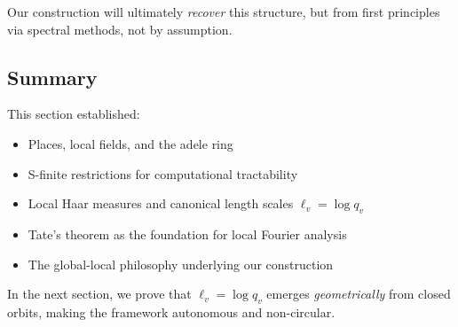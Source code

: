 Our construction will ultimately \emph{recover} this structure, but from first principles via spectral methods, not by assumption.

\subsection{Summary}

This section established:
\begin{itemize}
\item Places, local fields, and the adele ring
\item S-finite restrictions for computational tractability
\item Local Haar measures and canonical length scales $\ell_v = \log q_v$
\item Tate's theorem as the foundation for local Fourier analysis
\item The global-local philosophy underlying our construction
\end{itemize}

In the next section, we prove that $\ell_v = \log q_v$ emerges \emph{geometrically} from closed orbits, making the framework autonomous and non-circular.
